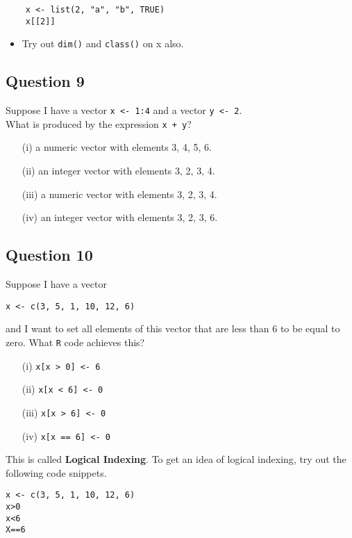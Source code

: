\documentclass[12pt]{article}
\begin{document}
\begin{framed}
	\begin{verbatim}
	x <- list(2, "a", "b", TRUE)
	x[[2]]
	\end{verbatim}	
\end{framed}

\begin{itemize}
	\item Try out \texttt{dim()} and \texttt{class()} on x also.
	\end{itemize}
\newpage
\subsection*{Question 9}
\Large
Suppose I have a vector \texttt{x <- 1:4} and a vector \texttt{y <- 2}. \\ What is produced by the expression \texttt{x + y}?
\begin{itemize}
	\item[(i)] a numeric vector with elements 3, 4, 5, 6.
	\item[(ii)] an integer vector with elements 3, 2, 3, 4.
	\item[(iii)] a numeric vector with elements 3, 2, 3, 4.
	\item[(iv)] an integer vector with elements 3, 2, 3, 6.
\end{itemize}

\newpage
\subsection*{Question 10}
\Large
Suppose I have a vector 
\begin{verbatim}
x <- c(3, 5, 1, 10, 12, 6) 
\end{verbatim}
and I want to set all elements of this vector that are less than 6 to be equal to zero. What \texttt{R} code achieves this?
\begin{itemize}
\item[(i)] \texttt{x[x > 0] <- 6}
\item[(ii)]\texttt{x[x < 6] <- 0}
\item[(iii)] \texttt{x[x > 6] <- 0}
\item[(iv)] \texttt{x[x == 6] <- 0}
\end{itemize}
\bigskip
\noindent This is called \textbf{Logical Indexing}. To get an idea of logical indexing, try out the following code snippets.
\begin{framed}
\begin{verbatim}
x <- c(3, 5, 1, 10, 12, 6) 
x>0
x<6
X==6
\end{verbatim}
\end{framed}
\newpage
\end{document}

